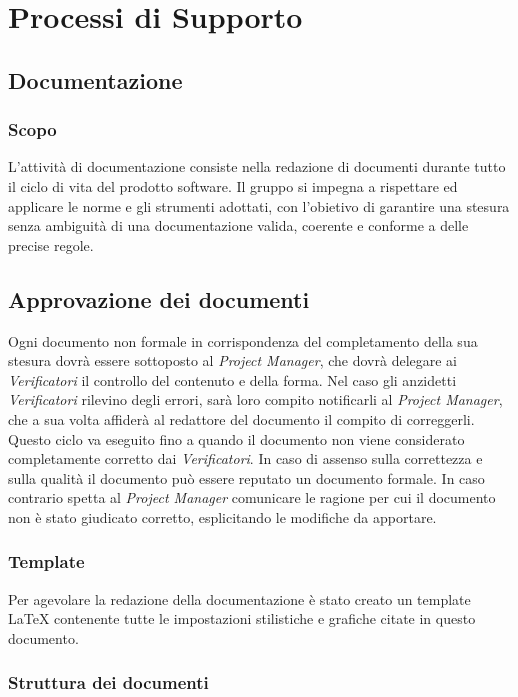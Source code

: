 \section{Processi di Supporto}


\subsection{Documentazione}
	
	\subsubsection{Scopo}
	L'attività di documentazione consiste nella redazione di documenti durante tutto il ciclo di vita del prodotto software. Il gruppo si impegna a rispettare ed applicare le norme e gli strumenti adottati, con l'obietivo di garantire una stesura senza ambiguità di una documentazione valida, coerente e conforme a delle precise regole.
	
	\subsection{Approvazione dei documenti}
	Ogni documento non formale in corrispondenza del completamento della sua stesura dovrà essere sottoposto al \textit{Project Manager}, che dovrà delegare ai \textit{Verificatori} il controllo del contenuto e della forma. Nel caso gli anzidetti \textit{Verificatori} rilevino degli errori, sarà loro compito notificarli al \textit{Project Manager}, che a sua volta affiderà al redattore del documento il compito di correggerli. Questo ciclo va eseguito fino a quando il documento non viene considerato completamente corretto dai  \textit{Verificatori}. In caso di assenso sulla correttezza e sulla qualità il documento può essere reputato un documento formale. In caso contrario spetta al \textit{Project Manager} comunicare le ragione per cui il documento non è stato giudicato corretto, esplicitando le modifiche da apportare.
		
	\subsubsection{Template}
	Per agevolare la redazione della documentazione è stato creato un template \LaTeX\text{ } contenente tutte le impostazioni stilistiche e grafiche citate in questo documento.
	
	\subsubsection{Struttura dei documenti}
	
